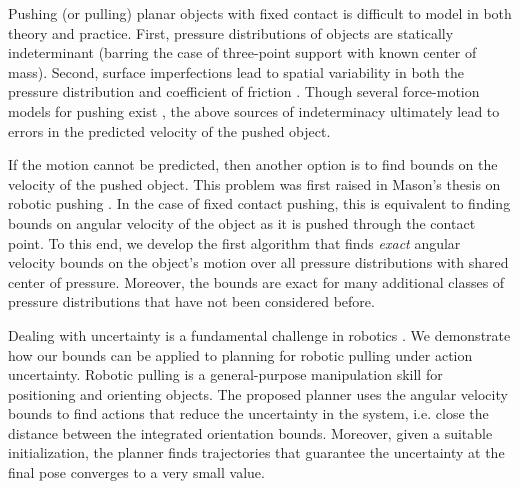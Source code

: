 \documentclass[conference]{IEEEtran}
\begin{document}



Pushing (or pulling) planar objects with fixed contact is difficult to
model in both theory and practice. First, pressure distributions of
objects are statically indeterminant (barring the case of three-point
support with known center of mass). Second, surface imperfections lead
to spatial variability in both the pressure distribution and
coefficient of friction \cite{YuBFR16}. Though several force-motion
models for pushing exist
\cite{zhou2016convex,howe1996practical,goyal1991planar}, the above
sources of indeterminacy ultimately lead to errors in the predicted
velocity of the pushed object.

If the motion cannot be predicted, then another option is to find
bounds on the velocity of the pushed object. This problem was first
raised in Mason's thesis on robotic pushing \cite{Mason1982}. In the
case of fixed contact pushing, this is equivalent to finding bounds on
angular velocity of the object as it is pushed through the contact
point. To this end, we develop the first algorithm that finds
\textit{exact} angular velocity bounds on the object's motion over all
pressure distributions with shared center of pressure. Moreover, the
bounds are exact for many additional classes of pressure distributions
that have not been considered before.

Dealing with uncertainty is a fundamental challenge in robotics
\cite{Thrun2005}. We demonstrate how our bounds can be applied to
planning for robotic pulling under action uncertainty. Robotic pulling
is a general-purpose manipulation skill for positioning and orienting
objects. The proposed planner uses the angular velocity bounds to find
actions that reduce the uncertainty in the system, i.e. close the
distance between the integrated orientation bounds. Moreover, given a
suitable initialization, the planner finds trajectories that guarantee
the uncertainty at the final pose converges to a very small value.
\end{document}
